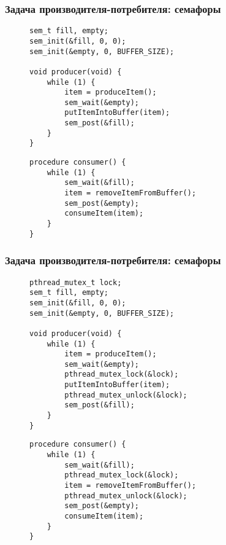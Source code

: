 \documentclass[aspectratio=169, pdf, 8pt, unicode]{beamer}
\begin{document}
\begin{frame}[fragile]
\frametitle{Задача производителя-потребителя: семафоры}
\begin{figure}[H]
\begin{minipage}{0.4\textwidth}
\begin{verbatim}
sem_t fill, empty;
sem_init(&fill, 0, 0);
sem_init(&empty, 0, BUFFER_SIZE);

void producer(void) {
    while (1) {
        item = produceItem();
        sem_wait(&empty);
        putItemIntoBuffer(item);
        sem_post(&fill);
    }
}
\end{verbatim}
\end{minipage}
\begin{minipage}{0.4\textwidth}
\begin{verbatim}
procedure consumer() {
    while (1) {
        sem_wait(&fill);
        item = removeItemFromBuffer();
        sem_post(&empty);
        consumeItem(item);
    }
}
\end{verbatim}
\end{minipage}
\end{figure}
\end{frame}

\begin{frame}[fragile]
\frametitle{Задача производителя-потребителя: семафоры}
\begin{figure}[H]
\begin{minipage}{0.4\textwidth}
\begin{verbatim}
pthread_mutex_t lock;
sem_t fill, empty;
sem_init(&fill, 0, 0);
sem_init(&empty, 0, BUFFER_SIZE);

void producer(void) {
    while (1) {
        item = produceItem();
        sem_wait(&empty);
        pthread_mutex_lock(&lock);
        putItemIntoBuffer(item);
        pthread_mutex_unlock(&lock);
        sem_post(&fill);
    }
}
\end{verbatim}
\end{minipage}
\begin{minipage}{0.4\textwidth}
\begin{verbatim}
procedure consumer() {
    while (1) {
        sem_wait(&fill);
        pthread_mutex_lock(&lock);
        item = removeItemFromBuffer();
        pthread_mutex_unlock(&lock);
        sem_post(&empty);
        consumeItem(item);
    }
}
\end{verbatim}
\end{minipage}
\end{figure}
\end{frame}
\end{document}
